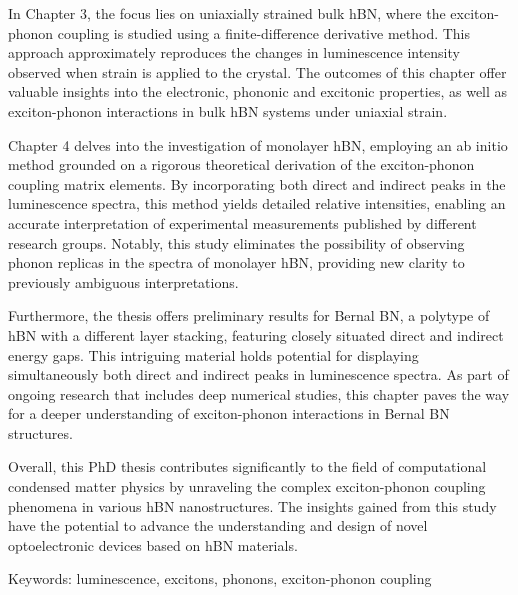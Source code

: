 In Chapter 3, the focus lies on uniaxially strained bulk hBN, where the exciton-phonon coupling is studied using a finite-difference derivative method. This approach approximately reproduces the changes in luminescence intensity observed when strain is applied to the crystal. The outcomes of this chapter offer valuable insights into the electronic, phononic and excitonic properties, as well as exciton-phonon interactions in bulk hBN systems under uniaxial strain.

Chapter 4 delves into the investigation of monolayer hBN, employing an ab initio method grounded on a rigorous theoretical derivation of the exciton-phonon coupling matrix elements. By incorporating both direct and indirect peaks in the luminescence spectra, this method yields detailed relative intensities, enabling an accurate interpretation of experimental measurements published by different research groups. Notably, this study eliminates the possibility of observing phonon replicas in the spectra of monolayer hBN, providing new clarity to previously ambiguous interpretations.

Furthermore, the thesis offers preliminary results for Bernal BN, a polytype of hBN with a different layer stacking, featuring closely situated direct and indirect energy gaps. This intriguing material holds potential for displaying simultaneously both direct and indirect peaks in luminescence spectra. As part of ongoing research that includes deep numerical studies, this chapter paves the way for a deeper understanding of exciton-phonon interactions in Bernal BN structures.

Overall, this PhD thesis contributes significantly to the field of computational condensed matter physics by unraveling the complex exciton-phonon coupling phenomena in various hBN nanostructures. The insights gained from this study have the potential to advance the understanding and design of novel optoelectronic devices based on hBN materials.

\vspace{0.5cm}
Keywords: luminescence, excitons, phonons, exciton-phonon coupling


